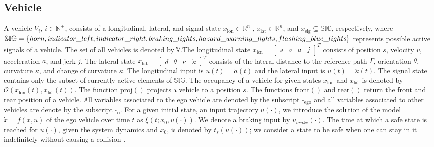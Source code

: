 \subsection{Vehicle}
A vehicle $V_i$, $i \in \mathbb{N}^+$, consists of a longitudinal, lateral, and signal state $x_\mathrm{lon} \in \mathbb{R}^n$ , $x_\mathrm{lat} \in \mathbb{R}^n$, and $x_\mathrm{sig} \subseteq \mathbb{SIG}$, respectively, where $\mathbb{SIG} = \{horn, indicator\_left,  indicator\_right, braking\_lights, hazard\_warning\_lights, \\ flashing\_blue\_lights\}$ represents possible active signals of a vehicle. The set of all vehicles is denoted by $\mathbb{V}$.The longitudinal state $x_\mathrm{lon} = \begin{bmatrix} s & v & a & j\end{bmatrix}^T$ consists of position $s$, velocity $v$, acceleration $a$, and jerk $j$. 
The lateral state $x_\mathrm{lat} = \begin{bmatrix} d & \theta & \kappa & \dot{\kappa} \end{bmatrix}^T$ consists of the lateral distance to the reference path $\Gamma$, orientation $\theta$, curvature $\kappa$, and change of curvature $\dot{\kappa}$. The longitudinal input is $u(t) = \ddot{a}(t)$ and the lateral input is $u(t) = \ddot{\kappa}(t)$. The signal state contains only the subset of currently active elements of $\mathbb{SIG}$. The occupancy of a vehicle for given states $x_\mathrm{lon}$ and $x_\mathrm{lat}$ is denoted by $\mathcal{O}(x_\mathrm{lon}(t), x_\mathrm{lat}(t))$. The function $\mathrm{proj()}$ projects a vehicle to a position $s$. The functions  $\mathrm{front()}$ and $\mathrm{rear()}$ return the front and rear position of a vehicle. All variables associated to the ego vehicle are denoted by the subscript $\square_\mathrm{ego}$ and all variables associated to other vehicles are denote by the subscript $\square_\mathrm{o}$.
For a given initial state, an input trajectory $u(\cdot)$, we introduce the solution of the model $\dot{x}=f(x,u)$ of the ego vehicle over time $t$ as $\xi(t;x_0,u(\cdot))$. 
We denote a braking input by $u_{brake}(\cdot)$.  The time at which a safe state is reached for $u(\cdot)$, given the system dynamics and $x_0$, is denoted by $t_s(u(\cdot))$; we consider a state to be safe when one can stay in it indefinitely without causing a collision \cite{Pek2018b}.

